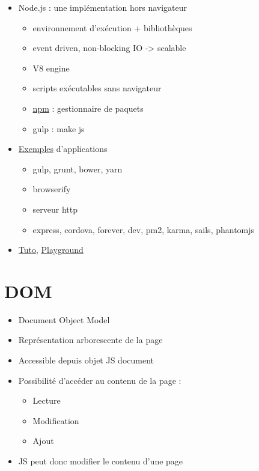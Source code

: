 \begin{itemize}
\tightlist
\item
  Node.js : une implémentation hors navigateur

  \begin{itemize}
  \tightlist
  \item
    environnement d'exécution + bibliothèques
  \item
    event driven, non-blocking IO -\textgreater{} scalable
  \item
    V8 engine
  \item
    scripts exécutables sans navigateur
  \item
    \href{https://www.npmjs.com}{npm} : gestionnaire de paquets
  \item
    gulp : make js
  \end{itemize}
\item
  \href{https://colorlib.com/wp/npm-packages-node-js/}{Exemples}
  d'applications

  \begin{itemize}
  \tightlist
  \item
    gulp, grunt, bower, yarn
  \item
    browserify
  \item
    serveur http
  \item
    express, cordova, forever, dev, pm2, karma, sails, phantomjs
  \end{itemize}
\item
  \href{https://www.tutorialspoint.com/nodejs/index.htm}{Tuto},
  \href{https://runkit.com}{Playground}
\end{itemize}

\hypertarget{dom}{%
\section{DOM}\label{dom}}

\begin{itemize}
\tightlist
\item
  Document Object Model
\item
  Représentation arborescente de la page
\item
  Accessible depuis objet JS document
\item
  Possibilité d'accéder au contenu de la page :

  \begin{itemize}
  \tightlist
  \item
    Lecture
  \item
    Modification
  \item
    Ajout
  \end{itemize}
\item
  JS peut donc modifier le contenu d'une page
\end{itemize}

